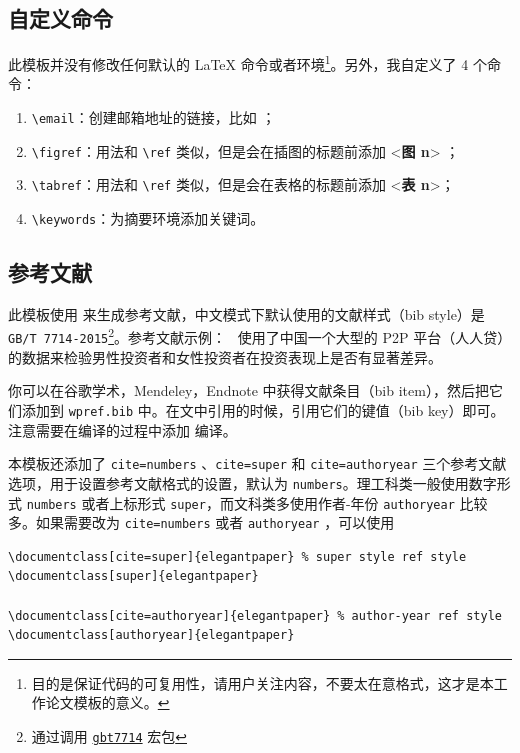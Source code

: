 \documentclass[lang=cn,11pt,a4paper,cite=authoryear]{elegantpaper}
\begin{document}
\subsection{自定义命令}
此模板并没有修改任何默认的 \LaTeX{} 命令或者环境\footnote{目的是保证代码的可复用性，请用户关注内容，不要太在意格式，这才是本工作论文模板的意义。}。另外，我自定义了 4 个命令：
\begin{enumerate}
  \item \lstinline{\email}：创建邮箱地址的链接，比如 ；
  \item \lstinline{\figref}：用法和 \lstinline{\ref} 类似，但是会在插图的标题前添加 <\textbf{图 n}> ；
  \item \lstinline{\tabref}：用法和 \lstinline{\ref} 类似，但是会在表格的标题前添加 <\textbf{表 n}>；
  \item \lstinline{\keywords}：为摘要环境添加关键词。
\end{enumerate}

\subsection{参考文献}
此模板使用  来生成参考文献，中文模式下默认使用的文献样式（bib style）是 \lstinline{GB/T 7714-2015}\footnote{通过调用 \href{https://ctan.org/pkg/gbt7714}{\lstinline{gbt7714}} 宏包}。参考文献示例：~\cite{en3} 使用了中国一个大型的 P2P 平台（人人贷）的数据来检验男性投资者和女性投资者在投资表现上是否有显著差异。

你可以在谷歌学术，Mendeley，Endnote 中获得文献条目（bib item），然后把它们添加到 \lstinline{wpref.bib} 中。在文中引用的时候，引用它们的键值（bib key）即可。注意需要在编译的过程中添加  编译。

本模板还添加了 \lstinline{cite=numbers} 、\lstinline{cite=super} 和 \lstinline{cite=authoryear}  三个参考文献选项，用于设置参考文献格式的设置，默认为 \lstinline{numbers}。理工科类一般使用数字形式 \lstinline{numbers} 或者上标形式 \lstinline{super}，而文科类多使用作者-年份 \lstinline{authoryear} 比较多。如果需要改为 \lstinline{cite=numbers}  或者  \lstinline{authoryear} ，可以使用
\begin{lstlisting}
\documentclass[cite=super]{elegantpaper} % super style ref style
\documentclass[super]{elegantpaper}

\documentclass[cite=authoryear]{elegantpaper} % author-year ref style
\documentclass[authoryear]{elegantpaper}
\end{lstlisting}
\end{document}
